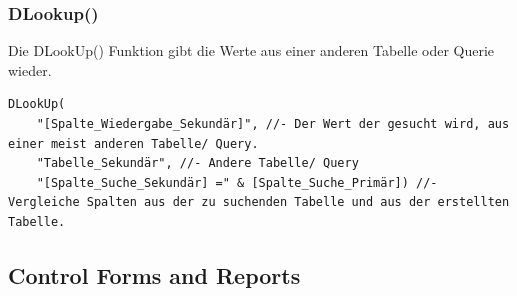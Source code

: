 \subsubsection{DLookup()}
Die DLookUp() Funktion gibt die Werte aus einer anderen Tabelle oder Querie wieder.
\begin{lstlisting}[style=VBA]
DLookUp(
	"[Spalte_Wiedergabe_Sekundär]", //- Der Wert der gesucht wird, aus einer meist anderen Tabelle/ Query.
	"Tabelle_Sekundär", //- Andere Tabelle/ Query
	"[Spalte_Suche_Sekundär] =" & [Spalte_Suche_Primär]) //- Vergleiche Spalten aus der zu suchenden Tabelle und aus der erstellten Tabelle. 
\end{lstlisting} 

\subsection{Control Forms and Reports}
